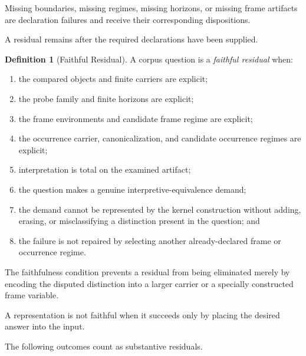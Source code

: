 \documentclass[11pt]{article}
\theoremstyle{plain}
\theoremstyle{definition}
\newtheorem{definition}[theorem]{Definition}
\theoremstyle{remark}
\begin{document}
Missing boundaries, missing regimes, missing horizons, or missing frame artifacts
are declaration failures and receive their corresponding dispositions.

A residual remains after the required declarations have been supplied.

\begin{definition}[Faithful Residual]
  \label{ik.def.residual}
  A corpus question is a \emph{faithful residual}
  when:
  \begin{enumerate}[label=(\alph*)]
    \item the compared objects
          and finite carriers are explicit;
    \item the probe family
          and finite horizons are explicit;
    \item the frame environments
          and candidate frame regime are explicit;
    \item the occurrence carrier,
          canonicalization,
          and candidate occurrence regimes are explicit;
    \item interpretation is total
          on the examined artifact;
    \item the question makes
          a genuine interpretive-equivalence demand;
    \item the demand cannot be represented
          by the kernel construction
          without adding,
          erasing,
          or misclassifying
          a distinction present in the question; and
    \item the failure is not repaired
          by selecting another already-declared
          frame or occurrence regime.
  \end{enumerate}
\end{definition}

The faithfulness condition prevents
a residual from being eliminated
merely by encoding the disputed distinction
into a larger carrier
or a specially constructed frame variable.

A representation is not faithful
when it succeeds only by placing
the desired answer into the input.

The following outcomes count
as substantive residuals.
\end{document}
